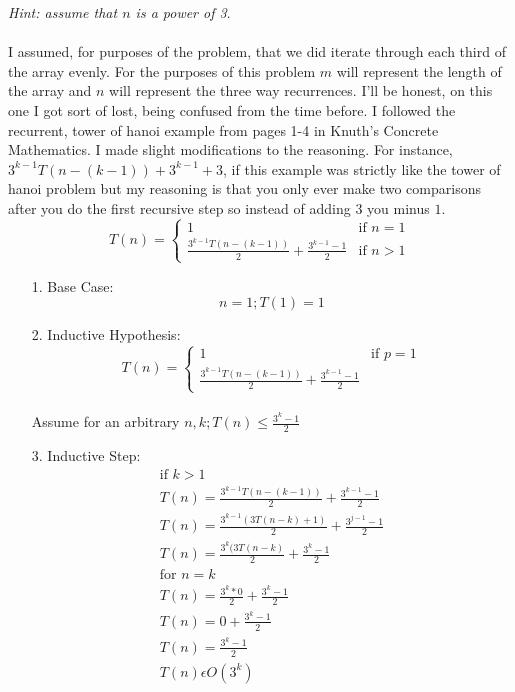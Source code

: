 \documentclass[paper=a4,fontsize=11pt]{article}
\begin{document}
\begin{enumerate}
\textit{Hint: assume that $n$ is a power of 3}.\\\\
I assumed, for purposes of the problem, that we did iterate through each third of the array evenly. For the purposes of this problem $m$ will represent the length of the array and $n$ will represent the three way recurrences. I'll be honest, on this one I got sort of lost, being confused from the time before. I followed the recurrent, tower of hanoi example from pages 1-4 in Knuth's Concrete Mathematics. I made slight modifications to the reasoning. For instance, $3^{k-1}T(n-(k-1)) + 3^{k-1} + 3$, if this example was strictly like the tower of hanoi problem but my reasoning is that you only ever make two comparisons after you do the first recursive step so instead of adding $3$ you minus $1$.
\[
  T(n) =
    \begin{cases}
        1 & \text{if $n = 1$} \\
        \frac{3^{k-1}T(n-(k-1))}{2} + \frac{3^{k-1} - 1}{2} & \text{if $n > 1$}
    \end{cases}
\]
\begin{enumerate}
\item[1.] Base Case:\\
$$n = 1; T(1) = 1$$
\item[2.] Inductive Hypothesis:\\
\[
  T(n) =
    \begin{cases}
        1 & \text{if $p = 1$} \\
        \frac{3^{k-1}T(n-(k-1))}{2} + \frac{3^{k-1} - 1}{2}
    \end{cases}
\]
\\Assume for an arbitrary $n,k; T(n) \leq \frac{3^k-1}{2}$
\item[3.] Inductive Step:
\begin{gather*}
\text{if $k > 1$}\\
T(n) = \frac{3^{k-1}T(n-(k-1))}{2} + \frac{3^{k-1} - 1}{2}\\
T(n) = \frac{3^{k-1}(3T(n-k)+ 1)}{2} + \frac{3^{j-1} - 1}{2}\\
T(n) = \frac{3^{k}(3T(n-k)}{2} + \frac{3^{k} - 1}{2}\\
\text{for $n = k$}\\
T(n) = \frac{3^{k}*0}{2} + \frac{3^{k} - 1}{2}\\
T(n) = 0 + \frac{3^{k} - 1}{2}\\
T(n) = \frac{3^{k} - 1}{2}\\
T(n) \epsilon O(3^k)\\
\end{gather*}
\end{enumerate}
\end{enumerate}
\end{document}
